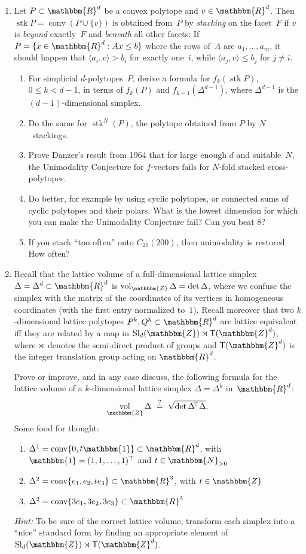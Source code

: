 \documentclass[11pt]{amsart}
\newcommand{\N}{\mathbbm{N}}
\newcommand{\R}{\mathbbm{R}}
\newcommand{\Z}{\mathbbm{Z}}
\newcommand{\sT}{\mathsf{T}}
\DeclareMathOperator{\conv}{conv}
\DeclareMathOperator{\stack}{stk}
\DeclareMathOperator{\vol}{vol}
\DeclareMathOperator{\Sl}{Sl}
\begin{document}
\begin{enumerate}
\setlength{\itemsep}{1ex}
\item Let $P\subset\R^d$ be a convex polytope and $v\in\R^d$. Then $\stack P=\conv(P\cup\{v\})$ is obtained from~$P$ by \emph{stacking} on the facet~$F$ if $v$ is \emph{beyond} exactly~$F$ and \emph{beneath} all other facets: If $P=\{x\in\R^d: Ax\le b\}$ where the rows of~$A$ are $a_1,\dots, a_m$, it should happen that $\langle a_i,v\rangle > b_i$ for exactly one~$i$, while $\langle a_j,v\rangle \le b_j$ for  $j\ne i$.
\begin{enumerate}
\item For simplicial $d$-polytopes~$P$, derive a formula for $f_k(\stack P)$, $0\le k<d-1$,  in terms of $f_k(P)$ and $f_{k-1}(\Delta^{d-1})$, where $\Delta^{d-1}$ is the $(d-1)$-dimensional simplex.
\item Do the same for $\stack^{N}(P)$, the polytope obtained from $P$ by $N$~stackings.
\item Prove Danzer's result from 1964 that for large enough $d$ and suitable~$N$, the Unimodality Conjecture for $f$-vectors fails for $N$-fold stacked cross-polytopes.
\item Do better, for example by using cyclic polytopes, or connected sums of cyclic polytopes and their polars. What is the lowest dimension for which you can make the Unimodality Conjecture fail? Can you beat 8?
\item If you stack ``too often'' onto $C_{20}(200)$, then unimodality is restored. How often?
\end{enumerate}

\item Recall that the lattice volume of a full-dimensional lattice simplex $\Delta=\Delta^d\subset\R^d$ is $\vol_\Z\Delta = \det\Delta$, where we confuse the simplex with the matrix of the coordinates of its vertices in homogeneous coordinates (with the first entry normalized to~$1$).
Recall moreover that two $k$-dimensional lattice polytopes $P^k,Q^k\subset\R^d$ are lattice equivalent iff they are related by a map in $\Sl_d(\Z)\rtimes \sT(\Z^d)$, where $\rtimes$~denotes the semi-direct product of groups and $\sT(\Z^d)$ is the integer translation group acting on $\R^d$. 

Prove or improve, and in any case discuss, the following formula for the lattice volume of a $k$-dimensional lattice simplex $\Delta=\Delta^k$ in~$\R^d$:
\[
    \vol_\Z\Delta
    \ \stackrel{?}{=} \
    \sqrt{\det \Delta\!^\top\Delta}.
\]
Some food for thought:
\begin{enumerate}
\item $\Delta^1 = \conv\{0,t\mathbbm{1}\}\subset\R^d$, with $\mathbbm{1} = (1,1,\dots,1)^\top$ and $t\in\N_{>0}$
\item $\Delta^2 = \conv\{e_1, e_2, te_3\}\subset\R^3$, with $t\in\Z$
\item $\Delta^2 = \conv\{3e_1,3e_2,3e_3\}\subset\R^3$
\end{enumerate}
\emph{Hint:} To be sure of the correct lattice volume, transform each simplex into a ``nice'' standard form by finding an appropriate element of $\Sl_d(\Z)\rtimes \sT(\Z^d)$.
\end{enumerate}
\end{document}
